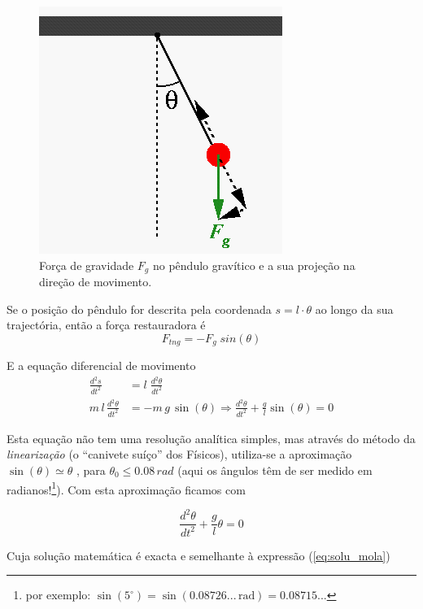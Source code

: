 \documentclass[a4paper,twoside,12pt]{article}      %
\begin{document}
\begin{figure}
	[!htbp] \centering 
	
	\includegraphics[width=0.5	\textwidth]{forcespend} \caption{Força de gravidade $F_g$ no pêndulo gravítico e a sua projeção na direção de movimento. \label{fig:3} } 
\end{figure}

Se o posição do pêndulo for descrita pela coordenada $s= l\cdot \theta$ ao longo da sua trajectória, 
então a força restauradora é 
\begin{equation}
	\label{eq:4} 
F_{tng} = - F_{g} \; sin(\theta) 
\end{equation}

E a equação diferencial de movimento 
\begin{align}
	\label{eq:5} 
	\frac{d^2 s}{dt^2} &=  l\;  \frac{d^2 \theta}{dt^2} \nonumber \\
	m \, l \, \frac{d^2 \theta}{dt^2} &= - m \,  g \, \sin(\theta)  \Rightarrow \frac{d^2 \theta}{dt^2} + \frac{g}{l} \sin(\theta) = 0
\end{align}

Esta equação não tem uma resolução analítica simples, mas através do método  da \emph{linearização} (o ``canivete suíço'' dos Físicos), utiliza-se a aproximação $ \sin(\theta) \simeq \theta$ , para  $\theta_0 \le 0.08\,rad$ (aqui  os ângulos têm de ser medido em radianos!\footnote{ por exemplo: $\sin(5 ^{\circ}) = \sin(0.08726... \, \text{rad}) = 0.08715... $}).
Com esta aproximação ficamos com 

\begin{equation}
	\label{eq:6} 
	 \frac{d^2 \theta}{dt^2} + \frac{g}{l} \theta =0
\end{equation}

Cuja solução matemática é exacta e semelhante à expressão (\ref{eq:solu_mola})
\end{document}
